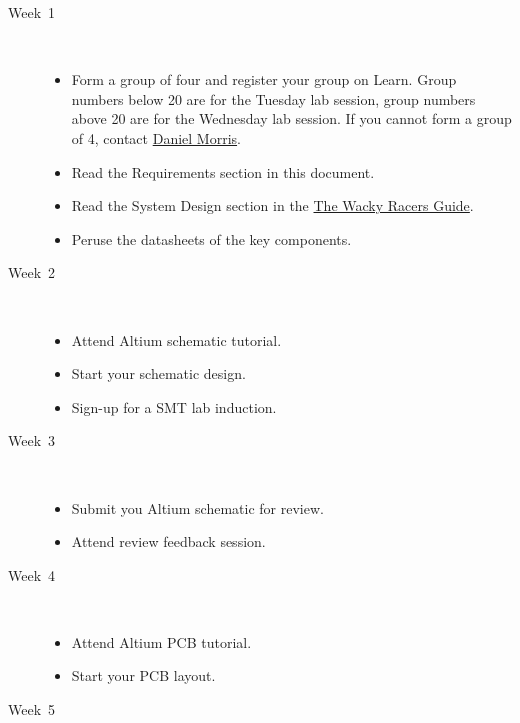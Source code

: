 \documentclass[11pt, a4paper]{article}
\makeatletter
\newcommand{\daniel}{\href{mailto:daniel.morris@pg.canterbury.ac.nz}{Daniel Morris}}
\newcommand{\theguide}{\href{https://eng-git.canterbury.ac.nz/wacky-racers/wacky-racers/-/blob/master/doc/guide/guide.pdf}{The Wacky Racers Guide}}
\makeatother
\begin{document}
\begin{description}
\item [Week~1]\mbox{}\\

  \begin{itemize}
  \item Form a group of four and register your group on Learn.  Group
    numbers below 20 are for the Tuesday lab session, group numbers
    above 20 are for the Wednesday lab session.  If you cannot form a
    group of 4, contact \daniel.

  \item Read the Requirements section in this document.

  \item Read the System Design section in the \theguide.

  \item Peruse the datasheets of the key components.
  \end{itemize}

\item [Week~2]\mbox{}\\

  \begin{itemize}
  \item Attend Altium schematic tutorial.

  \item Start your schematic design.

  \item Sign-up for a SMT lab induction.
  \end{itemize}

\item [Week~3]\mbox{}\\

  \begin{itemize}
  \item Submit you Altium schematic for review.
  \item Attend review feedback session.
  \end{itemize}

\item [Week~4]\mbox{}\\

  \begin{itemize}
  \item Attend Altium PCB tutorial.
  \item Start your PCB layout.
  \end{itemize}

\item [Week~5]\mbox{}\\


\end{description}
\end{document}
